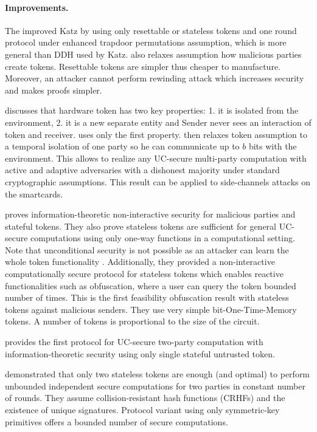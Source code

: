 \documentclass[
  digital, %
  twoside, %
  table,   %
  lof,     %
  lot,     %
]{fithesis3}
\newcommand{\cmmnt}[1]{\ignorespaces}
\newcounter{ph4_show_guides}
\theoremstyle{definition}
\theoremstyle{remark}
\begin{document}
\paragraph{Improvements.}%
The \cite{CGS08} improved Katz by using only resettable or stateless tokens and one round protocol under enhanced trapdoor permutations assumption, which is more general than DDH used by Katz. \cite{CGS08} also relaxes assumption how malicious parties create tokens\cmmnt{Attacker does not need to know the code}. Resettable tokens are simpler thus cheaper to manufacture. Moreover, an attacker cannot perform rewinding attack which increases security and makes proofs simpler.

\cite{DNW09} discusses that hardware token has two key properties: 1. it is isolated from the environment, 2. it is a new separate entity and Sender never sees an interaction of token and receiver. \cite{K07} uses only the first property. \cite{DNW09} then relaxes token assumption to a temporal isolation of one party so he can communicate up to $b$ bits with the environment. This allows to realize any UC-secure multi-party computation with active and adaptive adversaries with a dishonest majority under standard cryptographic assumptions. This result can be applied to side-channels attacks on the smartcards.

\cite{GISVW10} proves information-theoretic non-interactive security for malicious parties and stateful tokens. They also prove stateless tokens are sufficient for general UC-secure computations using only one-way functions in a computational setting. Note that unconditional security is not possible as an attacker can learn the whole token functionality \cite{GIMS10}. Additionally, they provided a non-interactive computationally secure protocol for stateless tokens which enables reactive functionalities such as obfuscation, where a user can query the token bounded number of times. This is the first feasibility obfuscation result with stateless tokens against malicious senders. They use very simple bit-One-Time-Memory tokens. A number of tokens is proportional to the size of the circuit.

\cite{DKM11} provides the first protocol for UC-secure two-party computation with information-theoretic security using only single stateful untrusted token.

\cite{CKSYZ14} demonstrated that only two stateless tokens are enough (and optimal) to perform unbounded independent secure computations for two parties in constant number of rounds.
They assume collision-resistant hash functions (CRHFs) and the existence of unique signatures. Protocol variant using only symmetric-key primitives offers a bounded number of secure computations.
\end{document}
